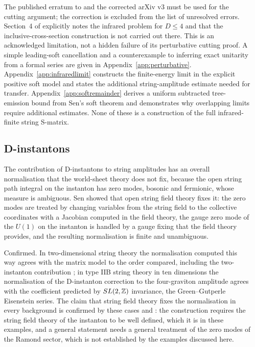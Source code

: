  The published erratum to \cite{Pius16} and the corrected arXiv v3 must be used for the cutting argument; the correction is excluded from the list of unresolved errors. Section~4 of \cite{Sen16unitarity} explicitly notes the infrared problem for $D\le4$ and that the inclusive-cross-section construction is not carried out there. This is an acknowledged limitation, not a hidden failure of its perturbative cutting proof. A simple leading-soft cancellation and a counterexample to inferring exact unitarity from a formal series are given in Appendix~\ref{app:perturbative}. Appendix~\ref{app:infraredlimit} constructs the finite-energy limit in the explicit positive soft model and states the additional string-amplitude estimate needed for transfer. Appendix~\ref{app:softremainder} derives a uniform subtracted tree-emission bound from Sen's soft theorem and demonstrates why overlapping limits require additional estimates. None of these is a construction of the full infrared-finite string S-matrix.

\subsection{D-instantons}\label{ssec:instantons}

The contribution of D-instantons to string amplitudes has an overall normalisation that the world-sheet theory does not fix, because the open string path integral on the instanton has zero modes, bosonic and fermionic, whose measure is ambiguous. Sen \cite{Sen20fixing,Sen21normalisation,Sen21IIB} showed that open string field theory fixes it: the zero modes are treated by changing variables from the string field to the collective coordinates with a Jacobian computed in the field theory, the gauge zero mode of the $U(1)$ on the instanton is handled by a gauge fixing that the field theory provides, and the resulting normalisation is finite and unambiguous.

\begin{verdict}[claim 32]
Confirmed. In two-dimensional string theory the normalisation computed this way \cite{Sen20fixing,Sen21Dinst} agrees with the matrix model to the order compared, including the two-instanton contribution \cite{BRY23}; in type IIB string theory in ten dimensions the normalisation of the D-instanton correction to the four-graviton amplitude \cite{Sen21IIB} agrees with the coefficient predicted by $SL(2,\mathbb{Z})$ invariance, the Green--Gutperle Eisenstein series. The claim that string field theory fixes the normalisation in every background is confirmed by these cases and : the construction requires the string field theory of the instanton to be well defined, which it is in these examples, and a general statement needs a general treatment of the zero modes of the Ramond sector, which is not established by the examples discussed here.
\end{verdict}

